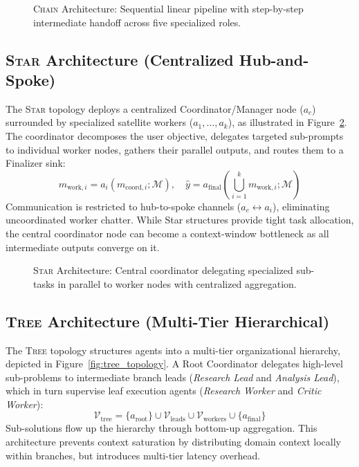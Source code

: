 \begin{figure}[h]
\centering

\caption{\textsc{Chain} Architecture: Sequential linear pipeline with step-by-step intermediate handoff across five specialized roles.}
\label{fig:chain_topology}
\end{figure}

\subsection{\textsc{Star} Architecture (Centralized Hub-and-Spoke)}
The \textsc{Star} topology deploys a centralized Coordinator/Manager node ($a_c$) surrounded by specialized satellite workers ($a_1, \dots, a_k$), as illustrated in Figure~\ref{fig:star_topology}. The coordinator decomposes the user objective, delegates targeted sub-prompts to individual worker nodes, gathers their parallel outputs, and routes them to a Finalizer sink:
\begin{equation}
m_{\text{work}, i} = a_i\left(m_{\text{coord}, i}; \mathcal{M}\right), \quad \hat{y} = a_{\text{final}}\left(\bigcup_{i=1}^k m_{\text{work}, i}; \mathcal{M}\right)
\end{equation}
Communication is restricted to hub-to-spoke channels ($a_c \leftrightarrow a_i$), eliminating uncoordinated worker chatter. While Star structures provide tight task allocation, the central coordinator node can become a context-window bottleneck as all intermediate outputs converge on it.

\begin{figure}[h]
\centering

\caption{\textsc{Star} Architecture: Central coordinator delegating specialized sub-tasks in parallel to worker nodes with centralized aggregation.}
\label{fig:star_topology}
\end{figure}

\subsection{\textsc{Tree} Architecture (Multi-Tier Hierarchical)}
The \textsc{Tree} topology structures agents into a multi-tier organizational hierarchy, depicted in Figure~\ref{fig:tree_topology}. A Root Coordinator delegates high-level sub-problems to intermediate branch leads (\textit{Research Lead} and \textit{Analysis Lead}), which in turn supervise leaf execution agents (\textit{Research Worker} and \textit{Critic Worker}):
\begin{equation}
\mathcal{V}_{\text{tree}} = \{a_{\text{root}}\} \cup \mathcal{V}_{\text{leads}} \cup \mathcal{V}_{\text{workers}} \cup \{a_{\text{final}}\}
\end{equation}
Sub-solutions flow up the hierarchy through bottom-up aggregation. This architecture prevents context saturation by distributing domain context locally within branches, but introduces multi-tier latency overhead.

